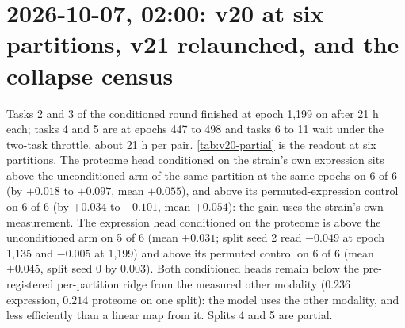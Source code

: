 
\clearpage
\section{2026-10-07, 02:00: v20 at six partitions, v21 relaunched, and the collapse census}

 Tasks 2 and 3 of the conditioned
round finished at epoch 1{,}199 on  after 21 h each; tasks 4 and 5 are at epochs
447 to 498 and tasks 6 to 11 wait under the two-task throttle, about 21 h per pair.
\cref{tab:v20-partial} is the readout at six partitions. The proteome head conditioned on the
strain's own expression sits above the unconditioned arm of the same partition at the same
epochs on 6 of 6 (by $+0.018$ to $+0.097$, mean $+0.055$), and above its permuted-expression
control on 6 of 6 (by $+0.034$ to $+0.101$, mean $+0.054$): the gain uses the strain's own
measurement. The expression head conditioned on the proteome is above the unconditioned arm
on 5 of 6 (mean $+0.031$; split seed 2 read $-0.049$ at epoch 1{,}135 and $-0.005$ at
1{,}199) and above its permuted control on 6 of 6 (mean $+0.045$, split seed 0 by $0.003$).
Both conditioned heads remain below the pre-registered per-partition ridge from the measured
other modality ($0.236$ expression, $0.214$ proteome on one split): the model uses the other
modality, and less efficiently than a linear map from it. Splits 4 and 5 are partial.



